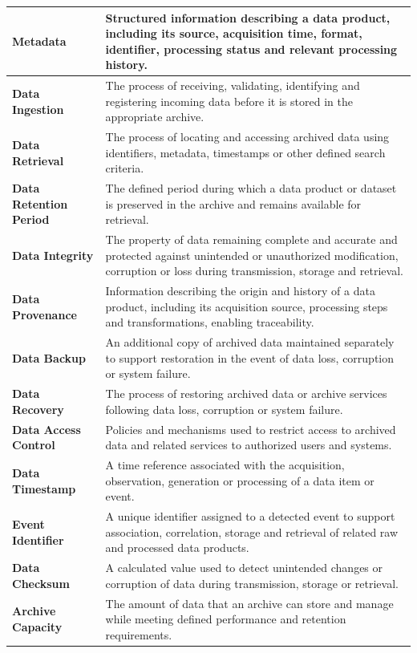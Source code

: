 {\begin{longtable}{|>{\raggedright\arraybackslash}p{}|>{\raggedright\arraybackslash}p{}|}
\textbf{Metadata} & Structured information describing a data product, including its source, acquisition time, format, identifier, processing status and relevant processing history. \\ \hline
\textbf{Data Ingestion} & The process of receiving, validating, identifying and registering incoming data before it is stored in the appropriate archive. \\ \hline
\textbf{Data Retrieval} & The process of locating and accessing archived data using identifiers, metadata, timestamps or other defined search criteria. \\ \hline
\textbf{Data Retention Period} & The defined period during which a data product or dataset is preserved in the archive and remains available for retrieval. \\ \hline
\textbf{Data Integrity} & The property of data remaining complete and accurate and protected against unintended or unauthorized modification, corruption or loss during transmission, storage and retrieval. \\ \hline
\textbf{Data Provenance} & Information describing the origin and history of a data product, including its acquisition source, processing steps and transformations, enabling traceability. \\ \hline
\textbf{Data Backup} & An additional copy of archived data maintained separately to support restoration in the event of data loss, corruption or system failure. \\ \hline
\textbf{Data Recovery} & The process of restoring archived data or archive services following data loss, corruption or system failure. \\ \hline
\textbf{Data Access Control} & Policies and mechanisms used to restrict access to archived data and related services to authorized users and systems. \\ \hline
\textbf{Data Timestamp} & A time reference associated with the acquisition, observation, generation or processing of a data item or event. \\ \hline
\textbf{Event Identifier} & A unique identifier assigned to a detected event to support association, correlation, storage and retrieval of related raw and processed data products. \\ \hline
\textbf{Data Checksum} & A calculated value used to detect unintended changes or corruption of data during transmission, storage or retrieval. \\ \hline
\textbf{Archive Capacity} & The amount of data that an archive can store and manage while meeting defined performance and retention requirements. \\ \hline

\end{longtable}}
